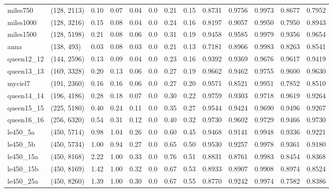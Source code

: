 \begin{tabular}{llrrrrrrrrrrr}
  miles750 &  (128, 2113) &  0.10 & 0.07 & 0.04 &  0.0 &  0.21 &   0.15 &   0.8731 &   0.9756 &    0.9973 &     0.8677 &      0.7952 \\
 miles1000 &  (128, 3216) &  0.15 & 0.08 & 0.04 &  0.0 &  0.24 &   0.16 &   0.8197 &   0.9057 &    0.9950 &     0.7950 &      0.8943 \\
 miles1500 &  (128, 5198) &  0.21 & 0.08 & 0.06 &  0.0 &  0.31 &   0.19 &   0.9458 &   0.9585 &    0.9979 &     0.9356 &      0.9654 \\
      anna &   (138, 493) &  0.03 & 0.08 & 0.03 &  0.0 &  0.21 &   0.13 &   0.7181 &   0.8966 &    0.9983 &     0.8263 &      0.8541 \\
queen12\_12 &  (144, 2596) &  0.13 & 0.09 & 0.04 &  0.0 &  0.23 &   0.16 &   0.9392 &   0.9369 &    0.9676 &     0.9617 &      0.9419 \\
queen13\_13 &  (169, 3328) &  0.20 & 0.13 & 0.06 &  0.0 &  0.27 &   0.19 &   0.9662 &   0.9462 &    0.9755 &     0.9600 &      0.9630 \\
   myciel7 &  (191, 2360) &  0.16 & 0.16 & 0.06 &  0.0 &  0.27 &   0.20 &   0.9571 &   0.8521 &    0.9951 &     0.7852 &      0.8510 \\
queen14\_14 &  (196, 4186) &  0.28 & 0.18 & 0.07 &  0.0 &  0.30 &   0.22 &   0.9759 &   0.9303 &    0.9718 &     0.9619 &      0.9264 \\
queen15\_15 &  (225, 5180) &  0.40 & 0.24 & 0.11 &  0.0 &  0.35 &   0.27 &   0.9544 &   0.9424 &    0.9690 &     0.9496 &      0.9267 \\
queen16\_16 &  (256, 6320) &  0.54 & 0.31 & 0.12 &  0.0 &  0.40 &   0.32 &   0.9730 &   0.9602 &    0.9729 &     0.9466 &      0.9730 \\
  le450\_5a &  (450, 5714) &  0.98 & 1.04 & 0.26 &  0.0 &  0.60 &   0.45 &   0.9468 &   0.9141 &    0.9948 &     0.9336 &      0.9221 \\
  le450\_5b &  (450, 5734) &  1.00 & 0.94 & 0.27 &  0.0 &  0.65 &   0.50 &   0.9530 &   0.9257 &    0.9978 &     0.9361 &      0.9180 \\
 le450\_15a &  (450, 8168) &  2.22 & 1.00 & 0.33 &  0.0 &  0.76 &   0.51 &   0.8831 &   0.8761 &    0.9983 &     0.8454 &      0.8368 \\
 le450\_15b &  (450, 8169) &  1.42 & 1.00 & 0.32 &  0.0 &  0.67 &   0.53 &   0.8933 &   0.8907 &    0.9908 &     0.8974 &      0.8524 \\
 le450\_25a &  (450, 8260) &  1.39 & 1.00 & 0.30 &  0.0 &  0.67 &   0.55 &   0.8770 &   0.9242 &    0.9974 &     0.7582 &      0.8386 \\

\end{tabular}
